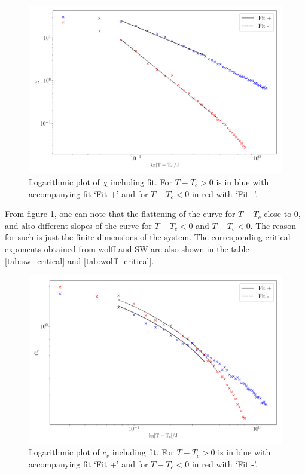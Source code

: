 \documentclass[a4paper,8pt]{article}
\begin{document}
\begin{figure}[htbp]
    \centering
    \includegraphics[scale = 0.3]{L40_SW_5000_chi_fitted_log.pdf}
    \caption{Logarithmic plot of $\chi$ including fit. For $T - T_c > 0$ is in blue with accompanying fit ‘Fit +’ and for $T - T_c < 0$ in red with ‘Fit -’.}
    \label{fig:log_mag_sus}
\end{figure}
From figure \ref{fig:log_mag_sus}, one can note that the flattening of the curve for $T - T_c$ close to 0, and also different slopes of the curve for $T - T_c < 0$ and $T - T_c < 0$. The reason for such is just the finite dimensions of the system. The corresponding critical exponents obtained from wolff and SW are also shown in the table \ref{tab:sw_critical} and \ref{tab:wolff_critical}.

\begin{figure}[htbp]
    \centering
    \includegraphics[scale = 0.35]{L40_SW_5000_c_v_fitted_log.pdf}
    \caption{Logarithmic plot of $c_v$ including fit. For $T - T_c > 0$ is in blue with accompanying fit ‘Fit +’ and for $T - T_c < 0$ in red with ‘Fit -’.}
    \label{fig:log_cv_spe}
\end{figure}
\end{document}
